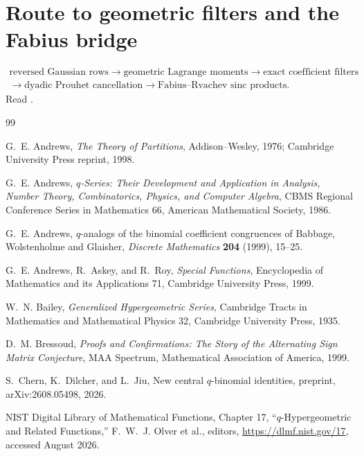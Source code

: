 \documentclass[11pt,oneside,openany]{book}
\theoremstyle{definition}
\theoremstyle{remark}
\begin{document}
\section*{Route to geometric filters and the Fabius bridge}
\[
\begin{gathered}
 \text{reversed Gaussian rows}
 \longrightarrow \text{geometric Lagrange moments}
 \longrightarrow \text{exact coefficient filters}\\
 \longrightarrow \text{dyadic Prouhet cancellation}
 \longrightarrow \text{Fabius--Rvachev sinc products}.
\end{gathered}
\]
Read .

\backmatter

\begin{thebibliography}{99}

G.~E. Andrews,
\emph{The Theory of Partitions},
Addison--Wesley, 1976; Cambridge University Press reprint, 1998.

G.~E. Andrews,
\emph{$q$-Series: Their Development and Application in Analysis, Number Theory, Combinatorics, Physics, and Computer Algebra},
CBMS Regional Conference Series in Mathematics 66, American Mathematical Society, 1986.

G.~E. Andrews,
$q$-analogs of the binomial coefficient congruences of Babbage, Wolstenholme and Glaisher,
\emph{Discrete Mathematics} \textbf{204} (1999), 15--25.

G.~E. Andrews, R.~Askey, and R.~Roy,
\emph{Special Functions},
Encyclopedia of Mathematics and its Applications 71, Cambridge University Press, 1999.

W.~N. Bailey,
\emph{Generalized Hypergeometric Series},
Cambridge Tracts in Mathematics and Mathematical Physics 32, Cambridge University Press, 1935.

D.~M. Bressoud,
\emph{Proofs and Confirmations: The Story of the Alternating Sign Matrix Conjecture},
MAA Spectrum, Mathematical Association of America, 1999.

S.~Chern, K.~Dilcher, and L.~Jiu,
New central $q$-binomial identities,
preprint, arXiv:2608.05498, 2026.

NIST Digital Library of Mathematical Functions,
Chapter 17, ``$q$-Hypergeometric and Related Functions,''
F.~W.~J. Olver et al., editors, \url{https://dlmf.nist.gov/17}, accessed August 2026.


\end{thebibliography}
\end{document}
